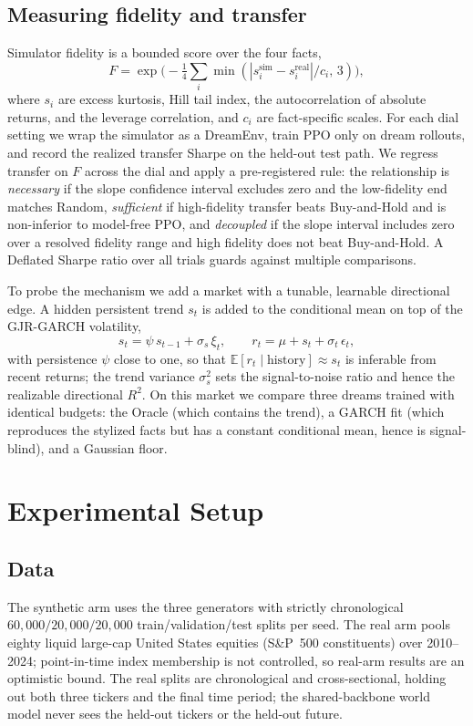 \documentclass[conference]{IEEEtran}
\begin{document}
\subsection{Measuring fidelity and transfer}\label{sec:measure}
Simulator fidelity is a bounded score over the four facts,
\begin{equation}
F = \exp\!\Big(-\tfrac{1}{4}\textstyle\sum_{i} \min(|s_i^{\text{sim}} - s_i^{\text{real}}|/c_i,\,3)\Big),
\label{eq:fidelity}
\end{equation}
where $s_i$ are excess kurtosis, Hill tail index, the autocorrelation of absolute returns, and the leverage correlation, and $c_i$ are fact-specific scales. For each dial setting we wrap the simulator as a DreamEnv, train PPO only on dream rollouts, and record the realized transfer Sharpe on the held-out test path. We regress transfer on $F$ across the dial and apply a pre-registered rule: the relationship is \emph{necessary} if the slope confidence interval excludes zero and the low-fidelity end matches Random, \emph{sufficient} if high-fidelity transfer beats Buy-and-Hold and is non-inferior to model-free PPO, and \emph{decoupled} if the slope interval includes zero over a resolved fidelity range and high fidelity does not beat Buy-and-Hold. A Deflated Sharpe ratio over all trials guards against multiple comparisons.

To probe the mechanism we add a market with a tunable, learnable directional edge. A hidden persistent trend $s_t$ is added to the conditional mean on top of the GJR-GARCH volatility,
\begin{equation}
s_t = \psi\,s_{t-1} + \sigma_s\,\xi_t, \qquad r_t = \mu + s_t + \sigma_t\,\epsilon_t,
\label{eq:momentum}
\end{equation}
with persistence $\psi$ close to one, so that $\mathbb{E}[r_t \mid \text{history}] \approx s_t$ is inferable from recent returns; the trend variance $\sigma_s^2$ sets the signal-to-noise ratio and hence the realizable directional $R^2$. On this market we compare three dreams trained with identical budgets: the Oracle (which contains the trend), a GARCH fit (which reproduces the stylized facts but has a constant conditional mean, hence is signal-blind), and a Gaussian floor.

\section{Experimental Setup}

\subsection{Data}
The synthetic arm uses the three generators with strictly chronological $60{,}000 / 20{,}000 / 20{,}000$ train/validation/test splits per seed. The real arm pools eighty liquid large-cap United States equities (S\&P~500 constituents) over 2010--2024; point-in-time index membership is not controlled, so real-arm results are an optimistic bound. The real splits are chronological and cross-sectional, holding out both three tickers and the final time period; the shared-backbone world model never sees the held-out tickers or the held-out future.
\end{document}
